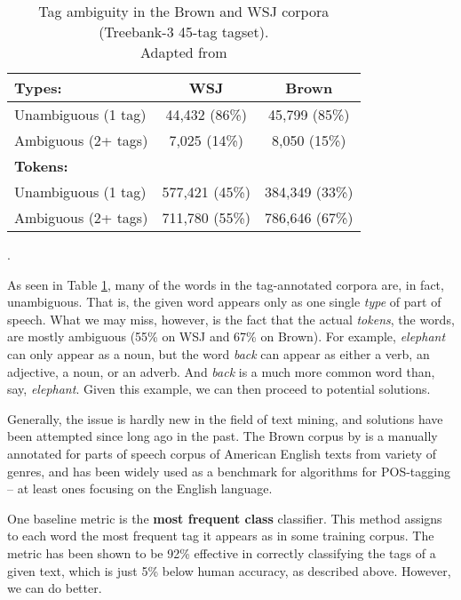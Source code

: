 \begin{table}[htbp]
    \centering
    \begin{tabular}{p{}cc}
        \toprule
        \textbf{Types:} & \textbf{WSJ} & \textbf{Brown} \\
        \midrule
        \quad Unambiguous (1 tag) &   44,432 (86\%) & 45,799 (85\%) \\
        \quad Ambiguous (2+ tags) & 7,025 (14\%)  & 8,050 (15\%) \\
        \midrule
        \textbf{Tokens:} & & \\
        \midrule
        \quad Unambiguous (1 tag) & 577,421 (45\%) &  384,349 (33\%) \\
        \quad Ambiguous (2+ tags) & 711,780 (55\%) & 786,646 (67\%) \\
        \bottomrule
    \end{tabular}
    \caption{Tag ambiguity in the Brown and WSJ corpora (Treebank-3 45-tag tagset). \\ Adapted from \cite{Jurafsky:2009:SLP:1214993}}.
    \label{tab:tokens_textbook}
\end{table}
As seen in Table \ref{tab:tokens_textbook}, many of the words in the tag-annotated corpora are, in fact, unambiguous. That is, the given word appears only as one single \textit{type} of part of speech. What we may miss, however, is the fact that the actual \textit{tokens}, the words, are mostly ambiguous (55\% on WSJ and 67\% on Brown). For example, \textit{elephant} can only appear as a noun, but the word \textit{back} can appear as either a verb, an adjective, a noun, or an adverb. And \textit{back} is a much more common word than, say, \textit{elephant}. Given this example, we can then proceed to potential solutions.

Generally, the issue is hardly new in the field of text mining, and solutions have been attempted since long ago in the past. The Brown corpus by \cite{francis1979brown} is a manually annotated for parts of speech corpus of American English texts from variety of genres, and has been widely used as a benchmark for algorithms for POS-tagging -- at least ones focusing on the English language. 

One baseline metric is the \textbf{most frequent class} classifier. This method assigns to each word the most frequent tag it appears as in some training corpus. The metric has been shown to be 92\% effective \citep{Jurafsky:2009:SLP:1214993} in correctly classifying the tags of a given text, which is just 5\% below human accuracy, as described above. However, we can do better.

